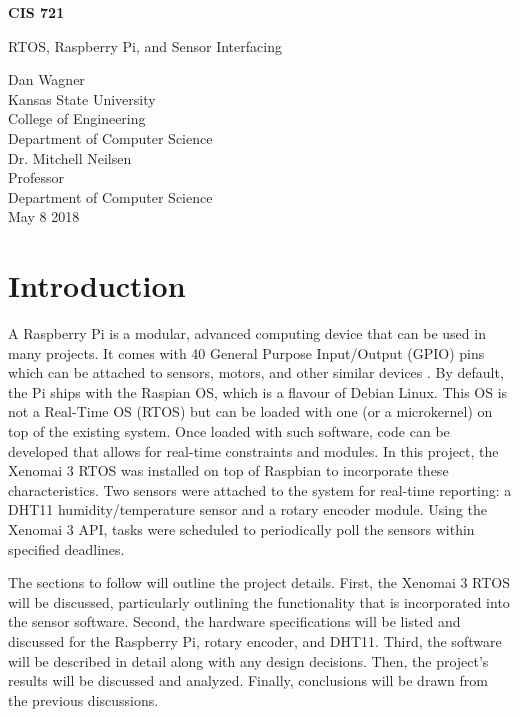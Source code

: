 \documentclass[letterpaper, 12pt]{article}
\begin{document}
	\begin{titlepage}
		\centering
		\vspace*{5.75cm}
		{\huge\bfseries CIS 721\par}
		{\large RTOS, Raspberry Pi, and Sensor Interfacing\par}
		\vspace{2cm}
		Dan Wagner\\
		Kansas State University\\
		College of Engineering\\
		Department of Computer Science\\
		\vspace{1cm}
		Dr. Mitchell Neilsen\\
		Professor\\
		Department of Computer Science\\
		\vspace{1cm}
		May 8 2018
	\end{titlepage}

\section{Introduction}
A Raspberry Pi is a modular, advanced computing device that can be used in many projects.  It comes with 40 General Purpose Input/Output (GPIO) pins which can be attached to sensors, motors, and other similar devices \cite{raspberrypifoundation2018}.  By default, the Pi ships with the Raspian OS, which is a flavour of Debian Linux.  This OS is not a Real-Time OS (RTOS) but can be loaded with one (or a microkernel) on top of the existing system.  Once loaded with such software, code can be developed that allows for real-time constraints and modules.  In this project, the Xenomai 3 RTOS was installed on top of Raspbian to incorporate these characteristics.  Two sensors were attached to the system for real-time reporting: a DHT11 humidity/temperature sensor and a rotary encoder module.  Using the Xenomai 3 API, tasks were scheduled to periodically poll the sensors within specified deadlines.

The sections to follow will outline the project details.  First, the Xenomai 3 RTOS will be discussed, particularly outlining the functionality that is incorporated into the sensor software.  Second, the hardware specifications will be listed and discussed for the Raspberry Pi, rotary encoder, and DHT11.  Third, the software will be described in detail along with any design decisions.  Then, the project's results will be discussed and analyzed.  Finally, conclusions will be drawn from the previous discussions.
~\newline
\end{document}
